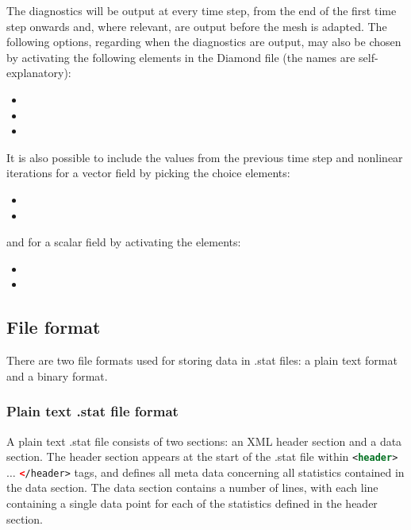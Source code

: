 The diagnostics will be output at every time step, from the end of the first time step onwards and, where relevant, are output before the mesh is adapted. The following options, regarding when the diagnostics are output, may also be chosen by activating the following elements in the Diamond file (the names are self-explanatory):
\begin{itemize}
\item {}
\item {}
\item {}
\end{itemize}  

It is also possible to include the values from the previous time step and nonlinear iterations for a vector field by picking the choice elements:
\begin{itemize}
\item {}
\item {}
\end{itemize}

and for a scalar field by activating the elements:

\begin{itemize}
\item {}
\item {}
\end{itemize}

\subsection{File format}

There are two file formats used for storing data in .stat files: a plain text format
and a binary format.

\subsubsection{Plain text .stat file format}

A plain text .stat file consists of two sections: an XML header section and a
data section. The header section appears at the start of the .stat file within
\lstinline[language = XML]*<header>* $\ldots$
\lstinline[language = XML]*</header>* tags, and defines all meta data concerning
all statistics contained in the data section. The data section contains a number of lines,
with each line containing a single data point for each of the statistics defined in the header
section.

